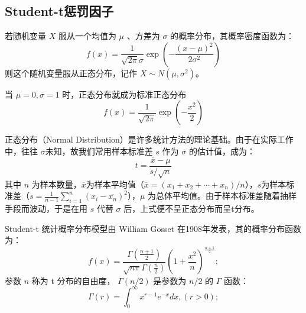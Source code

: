 \documentclass[oneside]{ZJUthesis}
\begin{document}
\subsection{Student-t惩罚因子}
\begin{defn}[正态分布]
	若随机变量 $X$ 服从一个均值为 $\mu$ 、方差为 $\sigma$ 的概率分布，其概率密度函数为：
	\begin{equation}
	f(x)=\frac{1}{\sqrt{2\pi}\sigma}\exp\left(-\frac{(x-\mu)^2}{2\sigma^2}\right)
	\end{equation}
	则这个随机变量服从正态分布，记作 $X\sim N(\mu,\sigma^2)$。
\end{defn}
\begin{defn}[标准正态分布]
	当 $\mu=0,\sigma=1$ 时，正态分布就成为标准正态分布
	\begin{equation}
	f(x)=\frac{1}{\sqrt{2\pi}}\exp\left(-\frac{x^2}{2}\right)
	\end{equation}
\end{defn}
正态分布（Normal Distribution）是许多统计方法的理论基础。由于在实际工作中，往往 $\sigma$未知，故我们常用样本标准差 $s$ 作为 $\sigma$ 的估计值，成为：
\begin{equation}
	t=\frac{\overline x-\mu}{s/\sqrt{n}}
\end{equation}
其中 $n$ 为样本数量，$\overline x$为样本平均值（$\overline x=(x_1+x_2+\cdots+x_n)/n$），$s$为样本标准差（$s=\frac{1}{n-1}\sum\limits_{i=1}^n{(x_i-\overline {x_n})^2}$），$\mu$ 为总体平均值。由于样本标准差随着抽样手段而波动，于是在用 $s$ 代替 $\sigma$ 后，上式便不呈正态分布而呈t分布。

Student-t 统计概率分布模型由 William Gosset 在1908年发表\cite{DBLP:conf/nips/WellingHO02}，其的概率分布函数为：
\begin{equation}
	f(x)=\frac{\Gamma(\frac{n+1}{2})}{\sqrt{n\pi}\Gamma(\frac{n}{2})}(1+\frac{x^2}{n})^{\frac{n+1}{2}};
\end{equation}
参数 $n$ 称为 t 分布的自由度， $\Gamma(n/2)$ 是参数为 $n/2$ 的 $\Gamma$ 函数：
\begin{equation}
	\Gamma(r)=\int_0^\infty{x^{r-1}e^{-x}dx},(r>0);
\end{equation}
\end{document}
